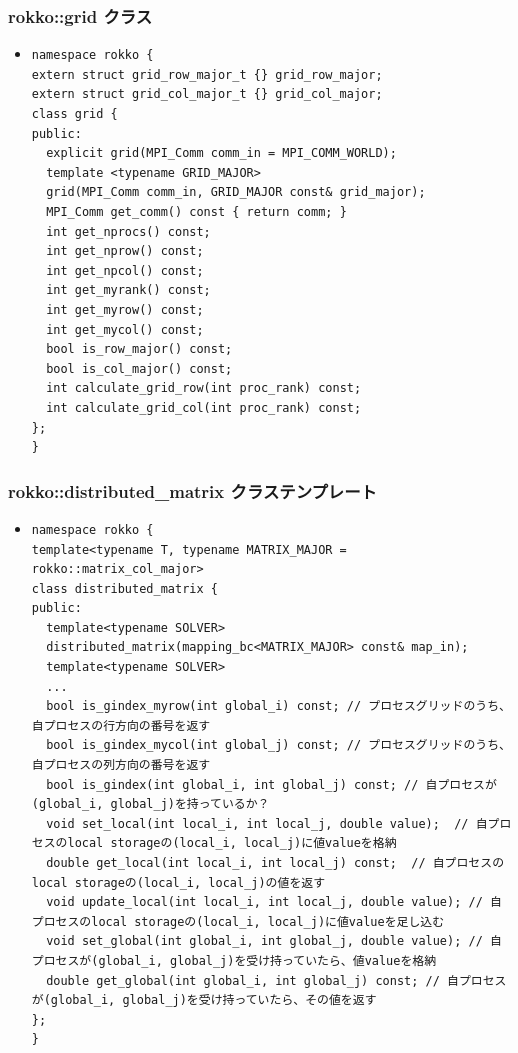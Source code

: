 \begin{frame}[c,fragile]
  \frametitle{rokko::grid クラス}
  \begin{itemize}
  \item {}
\begin{lstlisting}
namespace rokko {
extern struct grid_row_major_t {} grid_row_major;
extern struct grid_col_major_t {} grid_col_major;
class grid {
public:
  explicit grid(MPI_Comm comm_in = MPI_COMM_WORLD);
  template <typename GRID_MAJOR>
  grid(MPI_Comm comm_in, GRID_MAJOR const& grid_major);
  MPI_Comm get_comm() const { return comm; }
  int get_nprocs() const;
  int get_nprow() const;
  int get_npcol() const;
  int get_myrank() const;
  int get_myrow() const;
  int get_mycol() const;
  bool is_row_major() const;
  bool is_col_major() const;
  int calculate_grid_row(int proc_rank) const;
  int calculate_grid_col(int proc_rank) const;
};
}
\end{lstlisting}
  \end{itemize}
\end{frame}


\begin{frame}[c,fragile]
  \frametitle{rokko::distributed_matrix クラステンプレート}
  \begin{itemize}
  \item {}
\begin{lstlisting}
namespace rokko {
template<typename T, typename MATRIX_MAJOR = rokko::matrix_col_major>
class distributed_matrix {
public:
  template<typename SOLVER>
  distributed_matrix(mapping_bc<MATRIX_MAJOR> const& map_in);
  template<typename SOLVER>
  ...
  bool is_gindex_myrow(int global_i) const; // プロセスグリッドのうち、自プロセスの行方向の番号を返す
  bool is_gindex_mycol(int global_j) const; // プロセスグリッドのうち、自プロセスの列方向の番号を返す
  bool is_gindex(int global_i, int global_j) const; // 自プロセスが(global_i, global_j)を持っているか？
  void set_local(int local_i, int local_j, double value);  // 自プロセスのlocal storageの(local_i, local_j)に値valueを格納
  double get_local(int local_i, int local_j) const;  // 自プロセスのlocal storageの(local_i, local_j)の値を返す
  void update_local(int local_i, int local_j, double value); // 自プロセスのlocal storageの(local_i, local_j)に値valueを足し込む
  void set_global(int global_i, int global_j, double value); // 自プロセスが(global_i, global_j)を受け持っていたら、値valueを格納
  double get_global(int global_i, int global_j) const; // 自プロセスが(global_i, global_j)を受け持っていたら、その値を返す
};
}
\end{lstlisting}
  \end{itemize}
\end{frame}

